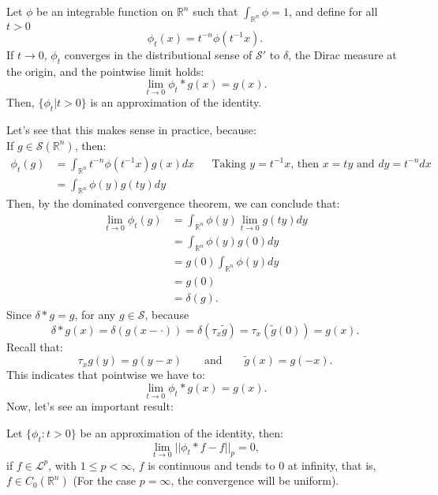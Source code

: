 \lipsum[5]
\begin{definition}{}
  Let $\phi$ be an integrable function on $\mathbb{R}^n$ such that $\int_{\mathbb{R}^n}\phi=1$, and define for all $t>0$ 
  $$\phi_t(x)=t^{-n}\phi(t^{-1}x).$$ 
  If $t\rightarrow 0$, $\phi_t$ converges in the distributional sense of $\mathcal{S}'$ to $\delta$, the Dirac measure at the origin, and the pointwise limit holds:
  $$\lim_{t\rightarrow0}\phi_t*g(x)=g(x).$$
  Then, $\{\phi_t|t>0\}$ is an approximation of the identity.
\end{definition}
Let’s see that this makes sense in practice, because:\\
If $g\in\mathcal{S}(\mathbb{R}^{n})$, then:
\begin{align*}
  \phi_t(g)&=\int_{\mathbb{R}^n}t^{-n}\phi(t^{-1}x)g(x)dx && \text{Taking $y=t^{-1}x$, then $x=ty$ and $dy=t^{-n}dx$}\\
  &=\int_{\mathbb{R}^n}\phi(y)g(ty)dy
\end{align*}
Then, by the dominated convergence theorem, we can conclude that:
\begin{align*}
  \lim_{t\rightarrow 0} \phi_t(g)&=\int_{\mathbb{R}^n}\phi(y)\lim_{t\rightarrow0}g(ty)dy\\
  &=\int_{\mathbb{R}^n}\phi(y)g(0)dy\\
  &=g(0)\int_{\mathbb{R}^n}\phi(y)dy\\
  &=g(0)\\
  &=\delta(g).
\end{align*}
Since $\delta*g=g$, for any $g\in\mathcal{S}$, because
$$\delta * g(x)=\delta (g(x-\cdot))=\delta (\tau_x \tilde{g})=\tau_x(\tilde{g}(0))=g(x).$$
Recall that:
$$\tau_x g(y)=g(y-x)\qquad \text{and} \qquad \tilde{g}(x)=g(-x).$$
This indicates that pointwise we have to:\\
$$\lim_{t\rightarrow 0}\phi_t*g(x)=g(x).$$
Now, let’s see an important result:
\begin{theorem}{}
  Let $\{\phi_t: t>0\}$ be an approximation of the identity, then:
  $$\lim_{t\rightarrow 0}||\phi_t*f-f||_p=0,$$
  if $f\in\mathcal{L}^p$, with $1\leq p < \infty$, $f$ is continuous and tends to $0$ at infinity, that is, $f\in C_0(\mathbb{R}^n)$ (For the case $p=\infty$, the convergence will be uniform).
\end{theorem}
